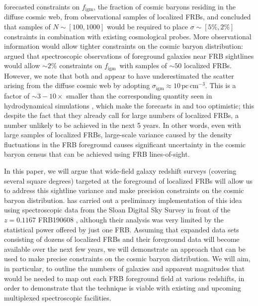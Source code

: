 \documentclass[twocolumn]{aastex63}
\newcommand{\pccmcube}{\ensuremath{\mathrm{pc}\,\mathrm{cm}^{-3}}}
\newcommand{\figm}{\ensuremath{f_\mathrm{igm}}}
\begin{document}
\begin{CJK*}{UTF8}{gbsn}
\citet{walters:2019} forecasted constraints on \figm, the fraction of cosmic baryons residing in the diffuse cosmic web, from observational samples of localized FRBs, 
and concluded that samples of $N \sim [100,1000]$ would be required to place $\sigma\sim [5\%, 2\%]$ constraints in combination with existing cosmological probes.
More observational information would allow tighter constraints on the cosmic baryon distribution: \citet{ravi:2019} argued that spectroscopic observations of foreground galaxies near FRB sightlines would allow $\sim 2\%$ constraints on \figm\ with samples of $\sim 50$ localized FRBs.
However, we note that both \citet{walters:2019} and \citet{ravi:2019} appear to have underestimated the scatter arising from the 
diffuse cosmic web by adopting $\sigma_\mathrm{igm} \approx 10\,\pccmcube$. This is a factor of $\sim 3-10\times$ smaller than
the corresponding quantity seen in hydrodynamical simulations \citep[e.g.,][]{jaroszynski:2019, takahashi:2020}, which make the 
forecasts in \citet{walters:2019} and \citet{ravi:2019} too optimistic;
this despite the fact that they already call 
for large numbers of localized FRBs, a number
unlikely to be achieved in the next 5 years.
In other words, even with large samples of localized FRBs, large-scale variance caused by the density fluctuations in the FRB foreground 
causes significant uncertainty in the cosmic baryon census that can be achieved using FRB lines-of-sight.

In this paper, we will argue that wide-field galaxy redshift surveys (covering several square degrees) targeted at the foreground of localized FRBs will allow us to address this sightline variance and make precision constraints on the
cosmic baryon distribution.  \citet{simha:2020} has carried out a preliminary implementation of this
idea using spectroscopic data from the Sloan Digital Sky Survey \citep[SDSS;][]{blanton:2005a,abazajian:2009} in front of the 
$z = 0.1167$ FRB190608 \citep{chittidi:2020}, 
although their analysis was %
very limited by the 
statistical power offered by just one FRB.
Assuming that expanded data sets consisting of dozens of localized FRBs and their foreground data will become available over the next few years, 
we will demonstrate an approach that can
be used to make precise constraints on the cosmic baryon distribution.
We will aim, in particular, to outline the numbers of galaxies and apparent magnitudes that would be needed to map out each FRB foreground field at various redshifts, in order
to demonstrate that the technique is viable with existing and upcoming multiplexed spectroscopic facilities.
 

\end{CJK*}
\end{document}
